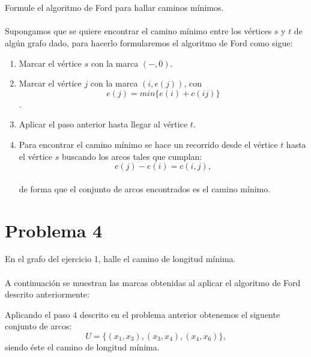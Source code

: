 \documentclass[autocontact]{gaceta}
\begin{document}
\section{}
    Formule el algoritmo de Ford para hallar caminos mínimos.\\
    \\Supongamos que se quiere encontrar el camino mínimo entre los vértices $s$ y $t$ de algún grafo dado,
        para hacerlo formularemos el algoritmo de Ford como sigue:
        \begin{center}
            \begin{enumerate}
                \item Marcar el vértice $s$ con la marca $(-, 0)$.
                \item Marcar el vértice $j$ con la marca $(i, e(j))$, con $$ e(j) = min \{e(i) + c(ij)\}$$.
                \item Aplicar el paso anterior hasta llegar al vértice $t$.
                \item Para encontrar el camino mínimo se hace un recorrido desde el vértice $t$ hasta el 
                        vértice $s$ buscando los arcos tales que cumplan: $$e(j) - e(i) = c(i,j),$$ \\de 
                        forma que el conjunto de arcos encontrados es el camino mínimo.
            \end{enumerate}
        \end{center}





\section{Problema 4}
    En el grafo del ejercicio 1, halle el camino de longitud mínima.\\
    \\A continuación se muestran las marcas obtenidas al aplicar el algoritmo de Ford 
    descrito anteriormente:
    
    

    Aplicando el paso $4$ descrito en el problema anterior obtenemos el siguente conjunto de arcos:
    $$ U = \{ (x_1, x_3), (x_3, x_4), (x_4, x_6)\}, $$
    siendo éste el camino de longitud mínima.
\end{document}
